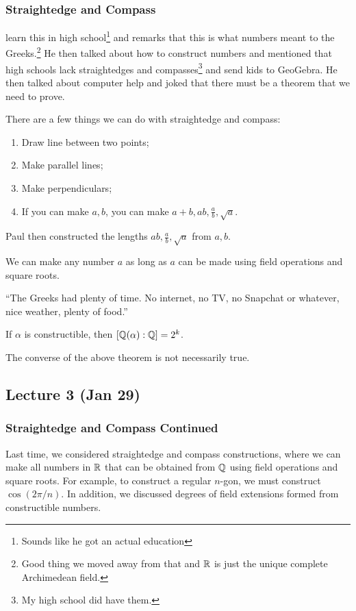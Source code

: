 \documentclass[10pt, twoside]{article}
\begin{document}
    \subsubsection{Straightedge and Compass}%
    learn this in high school\footnote{Sounds like he got an actual education}
    and remarks that this is what numbers meant to the Greeks.\footnote{Good
    thing we moved away from that and $\mathbb{R}$ is just the unique complete
Archimedean field.} He then talked about how to construct numbers and mentioned
that high schools lack straightedges and compasses\footnote{My high school did
have them.} and send kids to GeoGebra. He then talked about computer help and
joked that there must be a theorem that we need to prove.

    There are a few things we can do with straightedge and compass:
    \begin{enumerate} \item Draw line between two points; \item Make parallel
        lines; \item Make perpendiculars; \item If you can make $a,b$, you can
        make $a+b, ab, \frac{a}{b}, \sqrt{a}$.  \end{enumerate}

    Paul then constructed the lengths $ab, \frac{a}{b}, \sqrt{a}$ from $a,b$.
    
    We can make any number $a$ as long as $a$ can be made using field
    operations and square roots.

    ``The Greeks had plenty of time. No internet, no TV, no Snapchat or
    whatever, nice weather, plenty of food.''

    \begin{thm} If $\alpha$ is constructible, then $[\mathbb{Q}(\alpha):\mathbb{Q}] = 2^k$.
    \end{thm}

    \begin{rmk} The converse of the above theorem is not necessarily true.
    \end{rmk}

    \subsection{Lecture 3 (Jan 29)}

    \subsubsection{Straightedge and Compass Continued} Last time, we considered
    straightedge and compass constructions, where we can make all numbers in
    $\mathbb{R}$ that can be obtained from $\mathbb{Q}$ using field operations and square
    roots. For example, to construct a regular $n$-gon, we must construct
    $\cos(2\pi/n)$. In addition, we discussed degrees of field extensions
    formed from constructible numbers.
\end{document}
